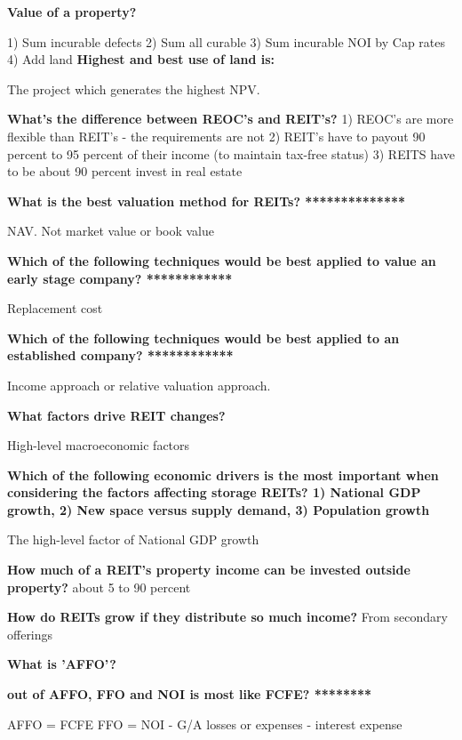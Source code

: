 \documentclass[12pt]{article}
\begin{document}
\textbf{Value of a property?}

1) Sum incurable defects
2) Sum all curable
3) Sum incurable NOI by Cap rates
4) Add land 
\textbf{Highest and best use of land is:}

The project which generates the highest NPV.

\textbf{What's the difference between REOC's and REIT's?}
1) REOC's are more flexible than REIT's - the requirements are not
2) REIT's have to payout 90 percent to 95 percent of their income (to maintain tax-free status)
3) REITS have to be about 90 percent invest in real estate

\textbf{What is the best valuation method for REITs?  **************}

NAV. Not market value or book value

\textbf{Which of the following techniques would be best applied to value an early stage company? ************}

Replacement cost

\textbf{Which of the following techniques would be best applied to an established company? ************}

Income approach or relative valuation approach.

\textbf{What factors drive REIT changes?}

High-level macroeconomic factors

\textbf{Which of the following economic drivers is the most important when considering the factors affecting storage REITs? 1) National GDP growth, 2) New space versus supply demand, 3) Population growth}

The high-level factor of National GDP growth

\textbf{How much of a REIT's property income can be invested outside property?}
about 5 to 90 percent

\textbf{How do REITs grow if they distribute so much income?}
From secondary offerings

\textbf{What is 'AFFO'?}


\textbf{out of AFFO, FFO and NOI  is most like FCFE? ********}

AFFO = FCFE
FFO = NOI - G/A losses or expenses - interest expense
\end{document}
